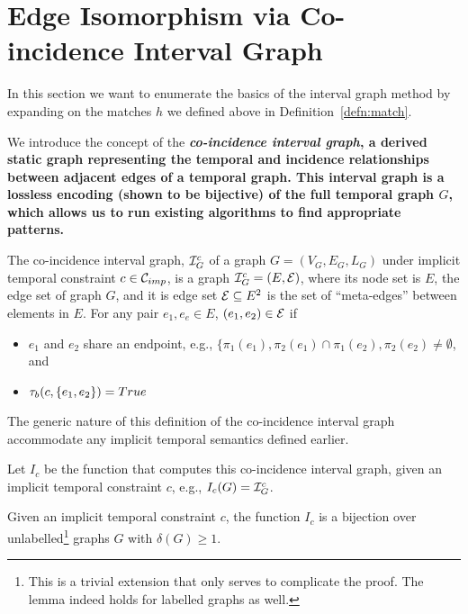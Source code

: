 \section{Edge Isomorphism via Co-incidence Interval Graph}

In this section we want to enumerate the basics of the interval graph method by
expanding on the matches $h$ we defined above in Definition~\ref{defn:match}. 

We introduce the concept of the {\bf {\em co-incidence interval graph}, a
  derived static graph representing the temporal and incidence relationships
  between adjacent edges of a temporal graph. This interval graph is a lossless
  encoding (shown to be bijective) of the full temporal graph $G$, which allows
  us to run existing algorithms to find appropriate patterns.}

\begin{defn}
  \label{def:ci_graph}
  The co-incidence interval graph, $\mathcal{I}_G^c$ of a graph $G = (V_G,E_G, L_G)$ under
  implicit temporal constraint $c \in \mathcal{C}_{imp}$, is a graph $\mathcal{I}_G^c = (E, \mathcal{E})$, where its 
  node set is $E$,  the edge set of  graph $G$,  and it is edge set $\mathcal{E} \subseteq E^2$ is
  the set of ``meta-edges'' between elements in $E$. For any pair $e_1, e_e \in E$, 
  $(e_1,e_2) \in \mathcal{E}$ if  
  \begin{itemize}
    \item $e_1$ and $e_2$ share an endpoint, e.g., $\{\pi_1(e_1), \pi_2(e_1) 
    	\cap \pi_1(e_2), \pi_2(e_2) \not= \emptyset$,  and
    \item $\tau_b(c,\{e_1,e_2\}) = True$
  \end{itemize}
\end{defn}

The generic nature of this definition of the co-incidence interval graph accommodate any 
implicit temporal semantics defined earlier.



 Let $I_c$ be the function that computes this co-incidence interval graph, given an implicit temporal constraint $c$, e.g., $I_c(G) = \mathcal{I}_G^c$.

\begin{lemma}
  \label{lem:ci_biject}
  Given an implicit temporal constraint $c$, the function $I_c$ is a bijection
  over unlabelled\footnote{This is a trivial extension that only serves to
    complicate the proof. The lemma indeed holds for labelled graphs as well.}
  graphs $G$ with $\delta(G) \geq 1$.
\end{lemma}

